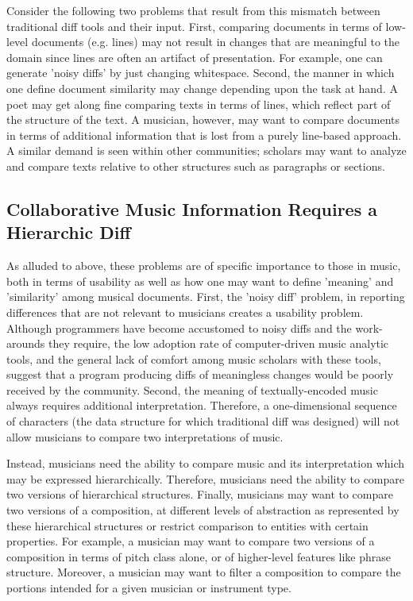 \documentclass{article}
\begin{document}
Consider the following two
problems that result from this mismatch between traditional diff tools
and their input.  First, comparing documents in terms of low-level
documents (e.g. lines) may not result in changes that are meaningful
to the domain since lines are often an artifact of presentation.  For
example, one can generate 'noisy diffs' by just changing whitespace.
Second, the manner in which one define document similarity may change
depending upon the task at hand.  A poet may get along fine comparing
texts in terms of lines, which reflect part of the structure of the
text.  A musician, however, may want to compare documents in terms of
additional information that is lost from a purely line-based
approach.  A similar demand is seen within other communities; scholars
may want to analyze and compare texts relative to other structures
such as paragraphs or sections.

\subsection{Collaborative Music Information Requires a Hierarchic Diff}
As alluded to above, these problems are of specific importance to
those in music, both in terms of usability as well as how one may want
to define 'meaning' and 'similarity' among musical documents.  First,
the 'noisy diff' problem, in reporting differences that are not
relevant to musicians creates a usability problem.  Although
programmers have become accustomed to noisy diffs and the work-arounds
they require, the low adoption rate of computer-driven music analytic
tools, and the general lack of comfort among music scholars with these
tools, suggest that a program producing diffs of meaningless changes
would be poorly received by the community.  Second, the meaning of
textually-encoded music always requires additional interpretation.
Therefore, a one-dimensional sequence of characters (the data
structure for which traditional diff was designed) will not allow
musicians to compare two interpretations of music.  

Instead, musicians
need the ability to compare music and its interpretation which may be
expressed hierarchically.  Therefore, musicians need the ability to
compare two versions of hierarchical structures.  Finally, musicians
may want to compare two versions of a composition, at different levels
of abstraction as represented by these hierarchical structures or
restrict comparison to entities with certain properties.  For example,
a musician may want to compare two versions of a composition in terms
of pitch class alone, or of higher-level features like phrase structure. Moreover, a musician may want to filter a composition to
compare the portions intended for a given musician or instrument type.
\end{document}
